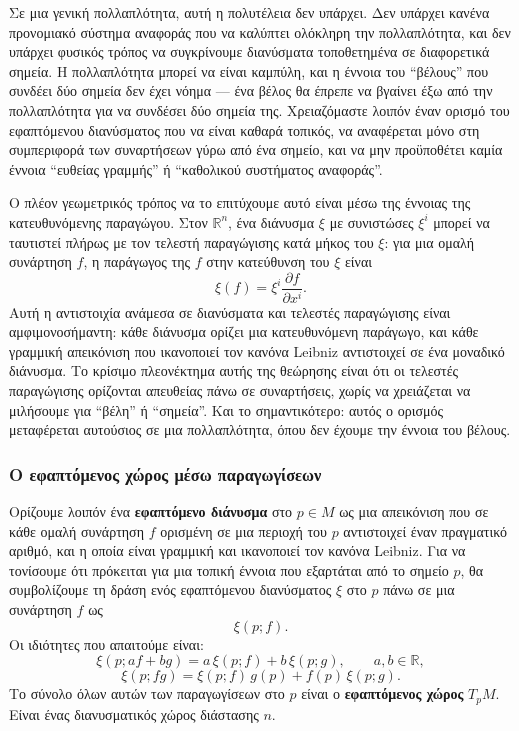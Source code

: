 \documentclass[12pt]{article}
\begin{document}
Σε μια γενική πολλαπλότητα, αυτή η πολυτέλεια δεν υπάρχει. Δεν υπάρχει κανένα προνομιακό σύστημα αναφοράς που να καλύπτει ολόκληρη την πολλαπλότητα, και δεν υπάρχει φυσικός τρόπος να συγκρίνουμε διανύσματα τοποθετημένα σε διαφορετικά σημεία. Η πολλαπλότητα μπορεί να είναι καμπύλη, και η έννοια του ``βέλους'' που συνδέει δύο σημεία δεν έχει νόημα --- ένα βέλος θα έπρεπε να βγαίνει έξω από την πολλαπλότητα για να συνδέσει δύο σημεία της. Χρειαζόμαστε λοιπόν έναν ορισμό του εφαπτόμενου διανύσματος που να είναι καθαρά τοπικός, να αναφέρεται μόνο στη συμπεριφορά των συναρτήσεων γύρω από ένα σημείο, και να μην προϋποθέτει καμία έννοια ``ευθείας γραμμής'' ή ``καθολικού συστήματος αναφοράς''.

Ο πλέον γεωμετρικός τρόπος να το επιτύχουμε αυτό είναι μέσω της έννοιας της κατευθυνόμενης παραγώγου. Στον $\mathbb{R}^n$, ένα διάνυσμα $\xi$ με συνιστώσες $\xi^i$ μπορεί να ταυτιστεί πλήρως με τον τελεστή παραγώγισης κατά μήκος του $\xi$: για μια ομαλή συνάρτηση $f$, η παράγωγος της $f$ στην κατεύθυνση του $\xi$ είναι
\[
\xi(f) = \xi^i \frac{\partial f}{\partial x^i}. \tag{0.2}
\]
Αυτή η αντιστοιχία ανάμεσα σε διανύσματα και τελεστές παραγώγισης είναι αμφιμονοσήμαντη: κάθε διάνυσμα ορίζει μια κατευθυνόμενη παράγωγο, και κάθε γραμμική απεικόνιση που ικανοποιεί τον κανόνα Leibniz αντιστοιχεί σε ένα μοναδικό διάνυσμα. Το κρίσιμο πλεονέκτημα αυτής της θεώρησης είναι ότι οι τελεστές παραγώγισης ορίζονται απευθείας πάνω σε συναρτήσεις, χωρίς να χρειάζεται να μιλήσουμε για ``βέλη'' ή ``σημεία''. Και το σημαντικότερο: αυτός ο ορισμός μεταφέρεται αυτούσιος σε μια πολλαπλότητα, όπου δεν έχουμε την έννοια του βέλους.

\subsubsection{Ο εφαπτόμενος χώρος μέσω παραγωγίσεων}

Ορίζουμε λοιπόν ένα \textbf{εφαπτόμενο διάνυσμα} στο $p \in M$ ως μια απεικόνιση που σε κάθε ομαλή συνάρτηση $f$ ορισμένη σε μια περιοχή του $p$ αντιστοιχεί έναν πραγματικό αριθμό, και η οποία είναι γραμμική και ικανοποιεί τον κανόνα Leibniz. Για να τονίσουμε ότι πρόκειται για μια τοπική έννοια που εξαρτάται από το σημείο $p$, θα συμβολίζουμε τη δράση ενός εφαπτόμενου διανύσματος $\xi$ στο $p$ πάνω σε μια συνάρτηση $f$ ως
\[
\xi(p; f).
\]
Οι ιδιότητες που απαιτούμε είναι:
\[
\xi(p; af + bg) = a \, \xi(p; f) + b \, \xi(p; g), \qquad a, b \in \mathbb{R},
\]
\[
\xi(p; f g) = \xi(p; f) \, g(p) + f(p) \, \xi(p; g).
\]
Το σύνολο όλων αυτών των παραγωγίσεων στο $p$ είναι ο \textbf{εφαπτόμενος χώρος} $T_pM$. Είναι ένας διανυσματικός χώρος διάστασης $n$.
\end{document}

